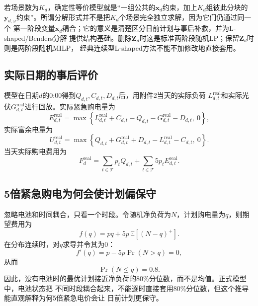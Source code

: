 \documentclass[UTF8,11pt]{ctexart}
\begin{document}
若场景数为$K_d$，确定性等价模型就是“一组公共的$\bm x_d$约束，加上$K_d$组彼此分块的
$\bm y_{d,\omega}$约束”。所谓分解形式并不是把$K_d$个场景完全独立求解，因为它们仍通过同一个
第一阶段变量$\bm x_d$耦合；它的意义是清楚区分日前计划与事后补救，并为L-shaped/Benders分解
提供结构基础。删除$\bm Z_d$时这是标准两阶段随机LP；保留$\bm Z_d$时则是两阶段随机MILP，
经典连续型L-shaped方法不能不加修改地直接套用。

\subsection{实际日期的事后评价}

模型在日期$d$的0:00得到$Q_{d,t},C_{d,t},D_{d,t}$后，用附件2当天的实际负荷
$L^{\mathrm{real}}_{d,t}$和实际光伏$G^{\mathrm{real}}_{d,t}$进行回放。实际紧急购电量为
\begin{equation}
E^{\mathrm{real}}_{d,t}
=\max\left\{
L^{\mathrm{real}}_{d,t}+C_{d,t}
-Q_{d,t}-G^{\mathrm{real}}_{d,t}-D_{d,t},\ 0
\right\},
\end{equation}
实际富余电量为
\begin{equation}
U^{\mathrm{real}}_{d,t}
=\max\left\{
Q_{d,t}+G^{\mathrm{real}}_{d,t}+D_{d,t}
-L^{\mathrm{real}}_{d,t}-C_{d,t},\ 0
\right\}.
\end{equation}
当天实际购电费用为
\begin{equation}
    F^{\mathrm{real}}_d
    =\sum_{t\in\mathcal{T}}p_tQ_{d,t}
    +\sum_{t\in\mathcal{T}}5p_tE^{\mathrm{real}}_{d,t}.
\end{equation}

\subsection{5倍紧急购电为何会使计划偏保守}

忽略电池和时间耦合，只看一个时段。令随机净负荷为$N$，计划购电量为$q$，则期望费用为
\begin{equation}
    f(q)=pq+5p\,\mathbb{E}\left[(N-q)^+\right].
\end{equation}
在分布连续时，对$q$求导并令其为0：
\begin{equation}
    f'(q)=p-5p\Pr(N>q)=0,
\end{equation}
从而
\begin{equation}
    \Pr(N\leq q)=0.8.
\end{equation}
因此，没有电池时的最优计划接近净负荷的80\%分位数，而不是均值。正式模型中，电池状态把
不同时段耦合起来，不能逐时直接套用80\%分位数，但这个推导能直观解释为何5倍紧急电价会让
日前计划更保守。
\end{document}

